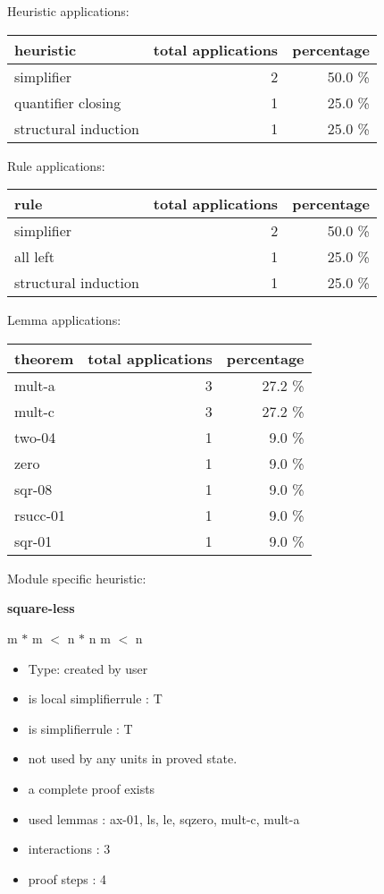 \documentclass[a4paper]{article}
\begin{document}
\medskip


Heuristic applications:

\begin{supertabular}{l|r|r}
heuristic	& total applications & percentage \\ \hline
simplifier & 2 & 50.0 \% \\
quantifier closing & 1 & 25.0 \% \\
structural induction & 1 & 25.0 \% \\

\end{supertabular}

Rule applications:

\begin{supertabular}{l|r|r}
rule	        & total applications & percentage \\ \hline
simplifier & 2 & 50.0 \% \\
all left & 1 & 25.0 \% \\
structural induction & 1 & 25.0 \% \\

\end{supertabular}

Lemma applications:

\begin{supertabular}{l|r|r}
theorem	        & total applications & percentage \\ \hline
mult-a & 3 & 27.2 \% \\
mult-c & 3 & 27.2 \% \\
two-04 & 1 & 9.0 \% \\
zero & 1 & 9.0 \% \\
sqr-08 & 1 & 9.0 \% \\
rsucc-01 & 1 & 9.0 \% \\
sqr-01 & 1 & 9.0 \% \\

\end{supertabular}

Module specific heuristic:

\pagebreak

{\LARGE\bf square-less}\label{lemma-square-less}

\medskip

 \Fol m $*$ m $<$ n $*$ n \Equiv m $<$ n

\begin{itemize}

\item Type: created by user

\item is local simplifierrule : T
\item is simplifierrule : T
\item not used by any units in proved state.
\item       a complete proof exists
\item       used lemmas  : ax-01, ls, le, sqzero, mult-c, mult-a
\item       interactions : 3
\item       proof steps  : 4
\end{itemize}
\end{document}
